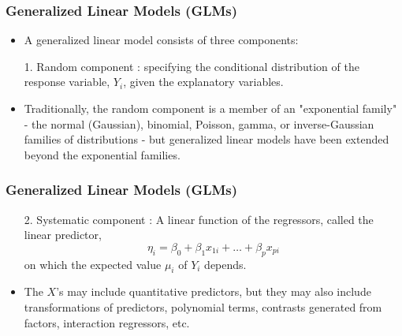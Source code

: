 \documentclass[10pt,xcolor={svgnames},t]{beamer}
\begin{document}
\begin{frame}
	\frametitle{Generalized Linear Models (GLMs)}
	
	\begin{itemize}
		\item A generalized linear model consists of three components:
		\bigskip
		\item[1.] Random component : specifying the conditional distribution of the response variable, $Y_i$, given the explanatory variables.
		\bigskip
		
	\end{itemize}
			\begin{itemize}
				\item Traditionally, the random component is a member of an "exponential family" - the normal (Gaussian), binomial, Poisson, gamma, or inverse-Gaussian families of distributions - but generalized linear models have been extended beyond the exponential families.
			\end{itemize}
	
\end{frame}
%
%
\begin{frame}
	\frametitle{Generalized Linear Models (GLMs)}
	
	\begin{itemize}
		\item[2.] Systematic component : A linear function of the regressors, called the linear predictor,
		\[
		\eta_i = \beta_0 + \beta_1 x_{1i} + \ldots + \beta_p x_{pi}
		\]
		on which the expected value $\mu_i$ of $Y_i$ depends.
		\bigskip
		
	\end{itemize}
			\begin{itemize}
				\item The $X$'s may include quantitative predictors, but they may also include transformations of predictors, polynomial terms, contrasts generated from factors, interaction regressors, etc.
			\end{itemize}
	
\end{frame}
%
%
%
\end{document}
